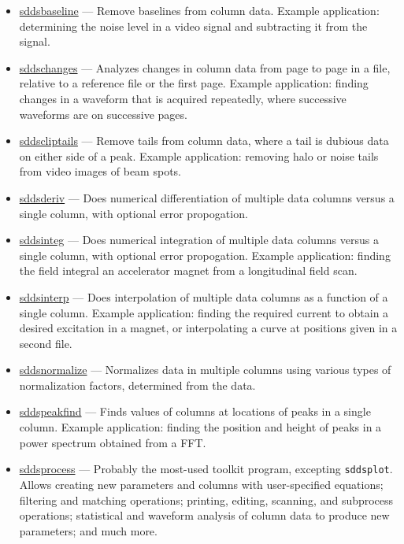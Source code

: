 \documentclass[11pt]{article}
\newcommand{\progref}[1]{\hyperref{#1}{{\tt #1} (}{)}{#1}}
\begin{document}
\begin{itemize}

\item \progref{sddsbaseline} --- Remove baselines from column data.  Example
application: determining the noise level in a video signal and subtracting
it from the signal.

\item \progref{sddschanges} --- Analyzes changes in column data from
page to page in a file, relative to a reference file or the first
page.  Example application: finding changes in a waveform that is
acquired repeatedly, where successive waveforms are on successive
pages.

\item \progref{sddscliptails} --- Remove tails from column data, where a 
tail is dubious data on either side of a peak.  Example application: 
removing halo or noise tails from video images of beam spots.

\item \progref{sddsderiv} --- Does numerical differentiation of multiple data columns
versus a single column, with optional error propogation.

\item \progref{sddsinteg} --- Does numerical integration of multiple data columns versus a single column, with
optional error propogation.  Example application: finding the field integral an accelerator magnet from a
longitudinal field scan.

\item \progref{sddsinterp} --- Does interpolation of multiple data columns as a function of a single column.
Example application: finding the required current to obtain a desired excitation in a magnet, or interpolating a
curve at positions given in a second file.

\item \progref{sddsnormalize} --- Normalizes data in multiple columns using various types of
normalization factors, determined from the data.  

\item \progref{sddspeakfind} --- Finds values of columns at locations of peaks in a single column.  Example
application: finding the position and height of peaks in a power spectrum obtained from a FFT.

\item \progref{sddsprocess} --- Probably the most-used toolkit program, excepting \verb|sddsplot|.  Allows
creating new parameters and columns with user-specified equations; filtering and matching operations; printing,
editing, scanning, and subprocess operations; statistical and waveform analysis of column data to produce new
parameters; and much more.


\end{itemize}
\end{document}
